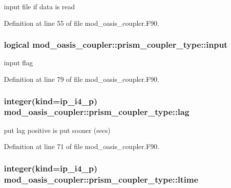 input file if data is read 



Definition at line 55 of file mod\+\_\+oasis\+\_\+coupler.\+F90.

\hypertarget{structmod__oasis__coupler_1_1prism__coupler__type_a1cda09cced2782af8cdccae35a00107d}{
\subsubsection[{input}]{\setlength{\rightskip}{0pt plus 5cm}logical mod\+\_\+oasis\+\_\+coupler\+::prism\+\_\+coupler\+\_\+type\+::input\hspace{0.3cm}{\ttfamily [private]}}}\label{structmod__oasis__coupler_1_1prism__coupler__type_a1cda09cced2782af8cdccae35a00107d}


input flag 



Definition at line 79 of file mod\+\_\+oasis\+\_\+coupler.\+F90.

\hypertarget{structmod__oasis__coupler_1_1prism__coupler__type_a5f95dd90844b18f8c619df9371a556c6}{
\subsubsection[{lag}]{\setlength{\rightskip}{0pt plus 5cm}integer(kind=ip\+\_\+i4\+\_\+p) mod\+\_\+oasis\+\_\+coupler\+::prism\+\_\+coupler\+\_\+type\+::lag\hspace{0.3cm}{\ttfamily [private]}}}\label{structmod__oasis__coupler_1_1prism__coupler__type_a5f95dd90844b18f8c619df9371a556c6}


put lag positive is put sooner (secs) 



Definition at line 71 of file mod\+\_\+oasis\+\_\+coupler.\+F90.

\hypertarget{structmod__oasis__coupler_1_1prism__coupler__type_a5d93a8e5b39d3b713e8f1bf4760b10f9}{
\subsubsection[{ltime}]{\setlength{\rightskip}{0pt plus 5cm}integer(kind=ip\+\_\+i4\+\_\+p) mod\+\_\+oasis\+\_\+coupler\+::prism\+\_\+coupler\+\_\+type\+::ltime\hspace{0.3cm}{\ttfamily [private]}}}\label{structmod__oasis__coupler_1_1prism__coupler__type_a5d93a8e5b39d3b713e8f1bf4760b10f9}


